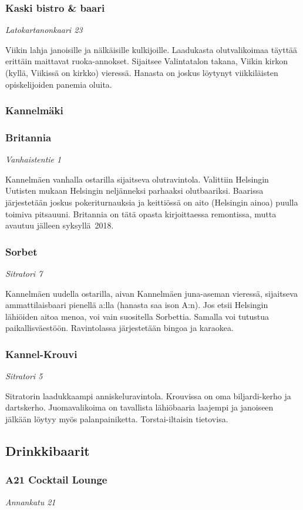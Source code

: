 \documentclass[../ala_hataile.tex]{subfiles}
\begin{document}
\subsubsection*{Kaski bistro \& baari}
\textit{Latokartanonkaari 23}

Viikin lahja janoisille ja nälkäisille kulkijoille.
Laadukasta olutvalikoimaa täyttää
erittäin maittavat ruoka-annokset. Sijaitsee
Valintatalon takana, Viikin kirkon (kyllä,
Viikissä on kirkko) vieressä. Hanasta on
joskus löytynyt viikkiläisten opiskelijoiden
panemia oluita.
\subsubsection*{Kannelmäki}
\subsubsection*{Britannia}
\textit{Vanhaistentie 1}

Kannelmäen vanhalla ostarilla sijaitseva
olutravintola. Valittiin Helsingin Uutisten
mukaan Helsingin neljänneksi parhaaksi
olutbaariksi. Baarissa järjestetään joskus
pokeriturnauksia ja keittiössä on aito (Helsingin
ainoa) puulla toimiva pitsauuni. Britannia on tätä opasta kirjoittaessa remontissa, mutta avautuu jälleen syksyllä~2018.
\subsubsection*{Sorbet}
\textit{Sitratori 7}

Kannelmäen uudella ostarilla, aivan
Kannelmäen juna-aseman vieressä, sijaitseva
ammattilaisbaari pienellä a:lla
(hanasta saa ison A:n). Jos etsii Helsingin
lähiöiden aitoa menoa, voi vain suositella
Sorbettia. Samalla voi tutustua paikallisväestöön.
Ravintolassa järjestetään bingoa ja
karaokea.
\subsubsection*{Kannel-Krouvi}
\textit{Sitratori 5}

Sitratorin laadukkaampi anniskeluravintola.
Krouvissa on oma biljardi-kerho ja
dartskerho. Juomavalikoima on tavallista
lähiöbaaria laajempi ja janoiseen jälkään
löytyy myös palanpainiketta. Torstai-iltaisin
tietovisa.
\subsection*{Drinkkibaarit}
\subsubsection*{A21 Cocktail Lounge}
\textit{Annankatu 21}
\end{document}
